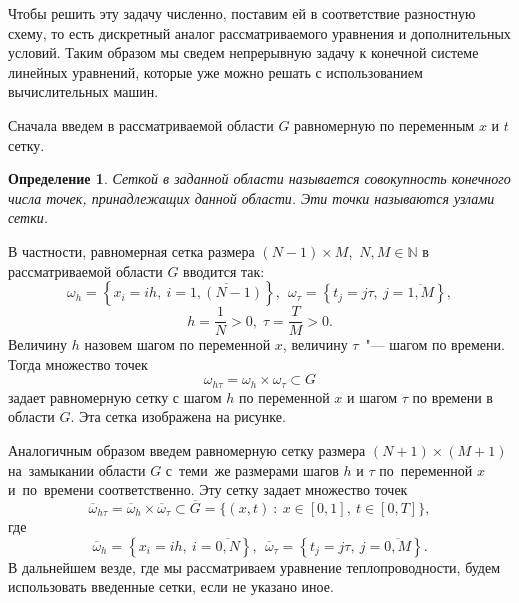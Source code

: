 \documentclass[11pt,a4paper,twoside,listtotoc,bibtotoc]{report}
\numberwithin{equation}{section}
\newtheorem*{definition}{Определение}
\theoremstyle{definition}
\theoremstyle{plain}
\begin{document}
Чтобы решить эту задачу численно, поставим ей в соответствие разностную схему, то есть
дискретный аналог рассматриваемого уравнения и дополнительных условий.
Таким образом мы сведем непрерывную задачу к конечной системе линейных
уравнений, которые уже можно решать с использованием вычислительных машин.

Сначала введем в рассматриваемой области $G$ равномерную по переменным
$x$ и $t$ сетку.
%
\begin{definition}
%
    Сеткой в заданной области называется совокупность конечного числа точек,
    принадлежащих данной области. Эти точки называются узлами сетки.
%
\end{definition}
%
В частности, равномерная сетка размера $(N-1)\times M$,\, $N, M \in\mathbb{N}$
в рассматриваемой области $G$ вводится так:
%
$$
%
    \omega_h = \left\{x_i = ih, ~i = \overline{1, (N - 1)}\right\},~~
    \omega_{\tau} = \left\{t_j = j\tau , ~j = \overline{1, M}\right\},
%
$$
%
$$
    h = \dfrac1N > 0,\; \tau = \dfrac{T}{M} > 0.
%
$$
%
Величину $h$ назовем шагом по переменной $x$, величину $\tau$~"--- шагом по времени. \\
Тогда множество точек
%
$$
    \omega_{h \tau} = \omega_h \times \omega_\tau \subset G
$$
%
задает равномерную сетку с шагом $h$ по переменной $x$ и шагом $\tau$
по времени в области $G$. Эта сетка изображена на рисунке.
%
\begin{figure}[H]
\centering
{}
\end{figure}

Аналогичным образом введем равномерную сетку размера $(N+1)\times(M+1)$
на~замыкании области $G$ с~теми~же размерами шагов $h$ и $\tau$ по~переменной
$x$ и~по~времени соответственно. Эту сетку задает множество точек
%
$$
    \overline{\omega}_{h \tau} = \overline{\omega}_h \times \overline{\omega}_\tau
    \subset \overline{G} = \{(x,t)~:~x \in [0,1],~t\in [0,T]\},
$$
%
где
%
$$
    \overline{\omega}_h = \left\{x_i = ih,~i = \overline{0, N}\right\},~~
    \overline{\omega}_{\tau} = \left\{t_j = j\tau ,~j = \overline{0,M}\right\}.
$$
%
В дальнейшем везде, где мы рассматриваем уравнение теплопроводности, будем использовать
введенные сетки, если не указано иное.
\end{document}
